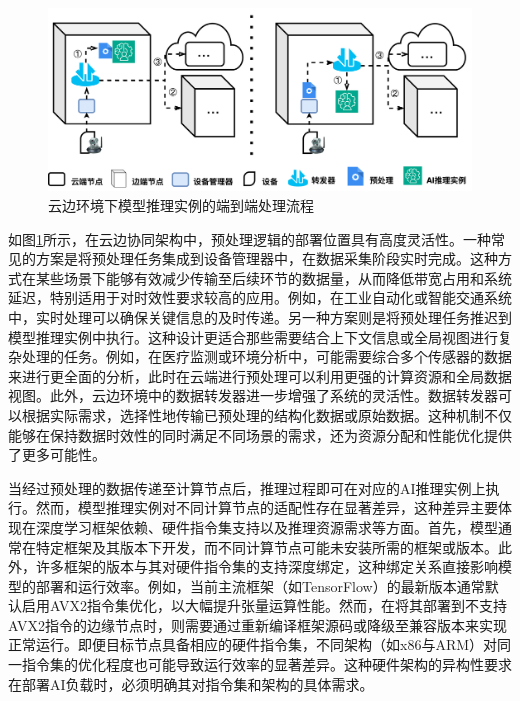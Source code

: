\begin{figure}[ht]
  \centering
  \includegraphics[width=\linewidth]{pics/3-4AI负载.png}
  \caption{云边环境下模型推理实例的端到端处理流程}
  \label{fig:3-4aiload}
\end{figure}

如图\ref{fig:3-4aiload}所示，在云边协同架构中，预处理逻辑的部署位置具有高度灵活性。一种常见的方案是将预处理任务集成到设备管理器中，在数据采集阶段实时完成。这种方式在某些场景下能够有效减少传输至后续环节的数据量，从而降低带宽占用和系统延迟，特别适用于对时效性要求较高的应用。例如，在工业自动化或智能交通系统中，实时处理可以确保关键信息的及时传递。另一种方案则是将预处理任务推迟到模型推理实例中执行。这种设计更适合那些需要结合上下文信息或全局视图进行复杂处理的任务。例如，在医疗监测或环境分析中，可能需要综合多个传感器的数据来进行更全面的分析，此时在云端进行预处理可以利用更强的计算资源和全局数据视图。此外，云边环境中的数据转发器进一步增强了系统的灵活性。数据转发器可以根据实际需求，选择性地传输已预处理的结构化数据或原始数据。这种机制不仅能够在保持数据时效性的同时满足不同场景的需求，还为资源分配和性能优化提供了更多可能性。


当经过预处理的数据传递至计算节点后，推理过程即可在对应的AI推理实例上执行。然而，模型推理实例对不同计算节点的适配性存在显著差异，这种差异主要体现在深度学习框架依赖、硬件指令集支持以及推理资源需求等方面。首先，模型通常在特定框架及其版本下开发，而不同计算节点可能未安装所需的框架或版本。此外，许多框架的版本与其对硬件指令集的支持深度绑定，这种绑定关系直接影响模型的部署和运行效率。例如，当前主流框架（如TensorFlow）的最新版本通常默认启用AVX2指令集优化，以大幅提升张量运算性能。然而，在将其部署到不支持AVX2指令的边缘节点时，则需要通过重新编译框架源码或降级至兼容版本来实现正常运行。即便目标节点具备相应的硬件指令集，不同架构（如x86与ARM）对同一指令集的优化程度也可能导致运行效率的显著差异\cite{ren2019performance}。这种硬件架构的异构性要求在部署AI负载时，必须明确其对指令集和架构的具体需求。

